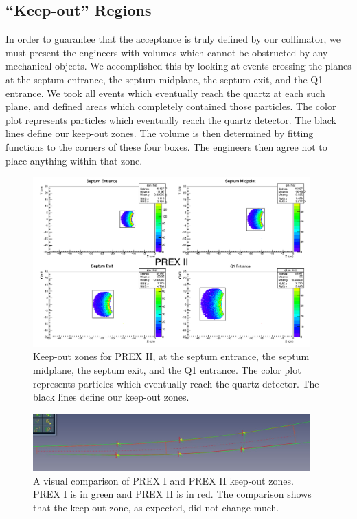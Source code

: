 \documentclass[11pt]{amsart}
\begin{document}
\subsection{ ``Keep-out'' Regions }

In order to guarantee that the acceptance is truly defined by our collimator, we must present the engineers with volumes which cannot be obstructed by any mechanical objects. We accomplished this by looking at events crossing the planes at the septum entrance, the septum midplane, the septum exit, and the Q1 entrance. We took all events which eventually reach the quartz at each such plane, and defined areas which completely contained those particles. The color plot represents particles which eventually reach the quartz detector. The black lines define our keep-out zones. The volume is then determined by fitting functions to the corners of these four boxes. The engineers then agree not to place anything within that zone.

\FloatBarrier

\begin{figure}
\includegraphics[width=0.95\textwidth]{plots/keepout.png}
\caption{Keep-out zones for PREX II, at the septum entrance, the septum midplane, the septum exit, and the Q1 entrance. The color plot represents particles which eventually reach the quartz detector. The black lines define our keep-out zones.}
\end{figure}

\begin{figure}
\includegraphics[width=0.95\textwidth]{plots/PREXvsPREXII.JPG}
\caption{A visual comparison of PREX I and PREX II keep-out zones. PREX I is in green and PREX II is in red. The comparison shows that the keep-out zone, as expected, did not change much.}
\end{figure}
\end{document}
